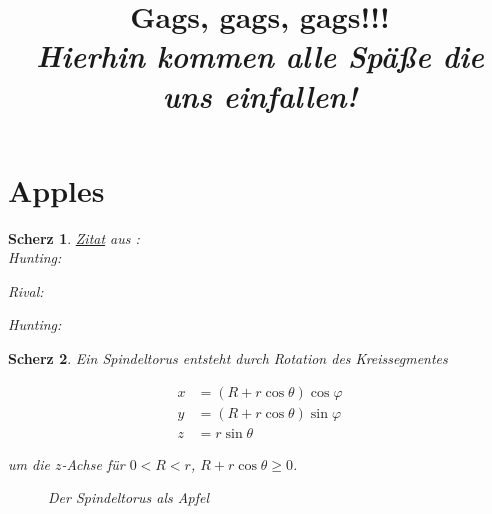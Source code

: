 \documentclass{article}
\title
{
  Gags, gags, gags!!! \\
  \vspace{4pt}
  \normalsize
  \textit{Hierhin kommen alle Späße die uns einfallen!}
}
\author{}
\date{}
\newtheorem{gag}{Scherz}[section]
\begin{document}
\maketitle

\section{Apples}

\begin{gag}

  \href{https://knowyourphrase.com/how-do-you-like-them-apples}{Zitat} aus : \\
  
  Hunting:
  
  Rival:
  
  Hunting:

\end{gag}

\begin{gag}

  Ein \textit{Spindeltorus} entsteht durch Rotation des Kreissegmentes

  \begin{align*}
    x & = (R + r \cos{\theta}) \cos{\varphi} \\
    y & = (R + r \cos{\theta}) \sin{\varphi} \\
    z & = r \sin{\theta}
  \end{align*}

  um die $z$-Achse für $0 < R < r$, $R + r \cos{\theta} \geq 0$.

  \begin{figure}[H]
    \centering
    \hspace{0mm}
    \caption{Der Spindeltorus als Apfel}
    \label{fig:apfel_apple}
  \end{figure}

\end{gag}
\end{document}

